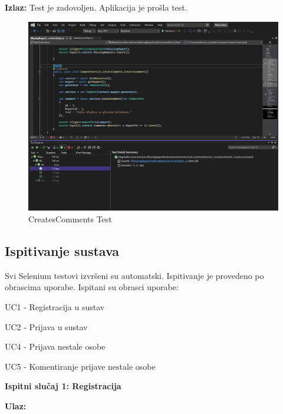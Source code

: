			\noindent \textbf{Izlaz:} Test je zadovoljen. Aplikacija je prošla test.
			
			\begin{figure}[H] \includegraphics[width=\linewidth]{./slike/Testovi/Unit/UnitTest_6.png}
				\caption{CreatesComments Test}
			\end{figure}
			
			\eject
			
			
			
			\subsection{Ispitivanje sustava}
			
			\par
			Svi Selenium testovi izvršeni su automatski. Ispitivanje je provedeno po obrascima uporabe. Ispitani su obrasci uporabe:
			
			\begin{packed_enum}
				
				\item UC1 - Registracija u sustav
				\item UC2 - Prijava u sustav
				\item UC4 - Prijava nestale osobe
				\item UC5 - Komentiranje prijave nestale osobe
				
			\end{packed_enum}
		
			
			\noindent \textbf{Ispitni slučaj 1: Registracija}
			
			\noindent \textbf{Ulaz:}
			

